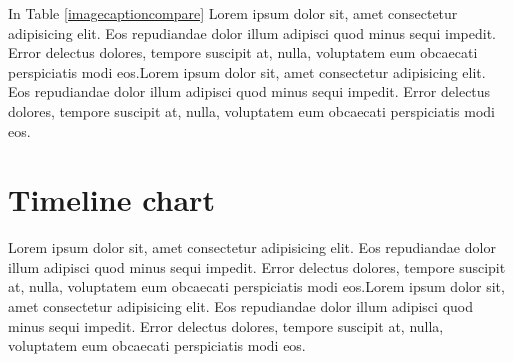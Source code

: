 In Table \ref{imagecaptioncompare} Lorem ipsum dolor sit, amet consectetur adipisicing elit. Eos repudiandae dolor illum adipisci quod minus sequi impedit. Error delectus dolores, tempore suscipit at, nulla, voluptatem eum obcaecati perspiciatis modi eos.Lorem ipsum dolor sit, amet consectetur adipisicing elit. Eos repudiandae dolor illum adipisci quod minus sequi impedit. Error delectus dolores, tempore suscipit at, nulla, voluptatem eum obcaecati perspiciatis modi eos.
\section{Timeline chart}

Lorem ipsum dolor sit, amet consectetur adipisicing elit. Eos repudiandae dolor illum adipisci quod minus sequi impedit. Error delectus dolores, tempore suscipit at, nulla, voluptatem eum obcaecati perspiciatis modi eos.Lorem ipsum dolor sit, amet consectetur adipisicing elit. Eos repudiandae dolor illum adipisci quod minus sequi impedit. Error delectus dolores, tempore suscipit at, nulla, voluptatem eum obcaecati perspiciatis modi eos.